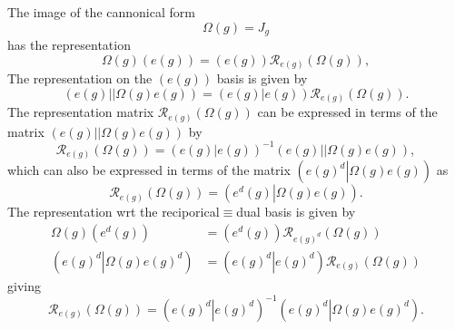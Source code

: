 \documentclass[aps,preprint]{revtex4}%
\begin{document}
The image of the cannonical form
\begin{equation}
\Omega\left(  g\right)  =J_{g}%
\end{equation}
has the representation
\begin{equation}
\Omega\left(  g\right)  \left(  e\left(  g\right)  \right)  =\left(  e\left(
g\right)  \right)  \mathcal{R}_{e\left(  g\right)  }\left(  \Omega\left(
g\right)  \right)  ,
\end{equation}
The representation on the $\left(  e\left(  g\right)  \right)  $ basis is
given by
\begin{equation}
\left(  e\left(  g\right)  \right\vert \left\vert \Omega\left(  g\right)
e\left(  g\right)  \right)  =\left(  \left.  e\left(  g\right)  \right\vert
e\left(  g\right)  \right)  \mathcal{R}_{e\left(  g\right)  }\left(
\Omega\left(  g\right)  \right)  .
\end{equation}
The representation matrix $\mathcal{R}_{e\left(  g\right)  }\left(
\Omega\left(  g\right)  \right)  $ can be expressed in terms of the matrix
$\left(  e\left(  g\right)  \right\vert \left\vert \Omega\left(  g\right)
e\left(  g\right)  \right)  $ by
\begin{equation}
\mathcal{R}_{e\left(  g\right)  }\left(  \Omega\left(  g\right)  \right)
=\left(  \left.  e\left(  g\right)  \right\vert e\left(  g\right)  \right)
^{-1}\left(  e\left(  g\right)  \right\vert \left\vert \Omega\left(  g\right)
e\left(  g\right)  \right)  ,
\end{equation}
which can also be expressed in terms of the matrix $\left(  \left.  e\left(
g\right)  ^{d}\right\vert \Omega\left(  g\right)  e\left(  g\right)  \right)
$ as
\begin{equation}
\mathcal{R}_{e\left(  g\right)  }\left(  \Omega\left(  g\right)  \right)
=\left(  \left.  e^{d}\left(  g\right)  \right\vert \Omega\left(  g\right)
e\left(  g\right)  \right)  .
\end{equation}
The representation wrt the reciporical$\equiv$dual basis is given by
\begin{align}
\Omega\left(  g\right)  \left(  e^{d}\left(  g\right)  \right)   &  =\left(
e^{d}\left(  g\right)  \right)  \mathcal{R}_{e\left(  g\right)  ^{d}}\left(
\Omega\left(  g\right)  \right) \\
\left(  \left.  e\left(  g\right)  ^{d}\right\vert \Omega\left(  g\right)
e\left(  g\right)  ^{d}\right)   &  =\left(  \left.  e\left(  g\right)
^{d}\right\vert e\left(  g\right)  ^{d}\right)  \mathcal{R}_{e\left(
g\right)  }\left(  \Omega\left(  g\right)  \right)
\end{align}
giving
\begin{equation}
\mathcal{R}_{e\left(  g\right)  }\left(  \Omega\left(  g\right)  \right)
=\left(  \left.  e\left(  g\right)  ^{d}\right\vert e\left(  g\right)
^{d}\right)  ^{-1}\left(  \left.  e\left(  g\right)  ^{d}\right\vert
\Omega\left(  g\right)  e\left(  g\right)  ^{d}\right)  .
\end{equation}
\end{document}
